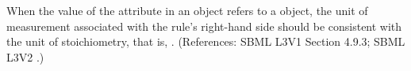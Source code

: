 When the value of the attribute  in an \AssignmentRule
object refers to a \SpeciesReference object, the unit of measurement
associated with the rule's right-hand side should be consistent with the
unit of stoichiometry, that is, .  (References: SBML L3V1 Section 4.9.3; SBML
L3V2 .)
